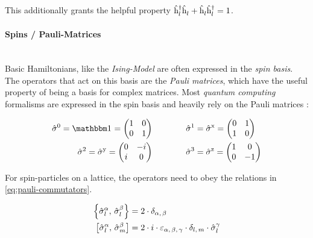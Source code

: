 This additionally grants the helpful property $\hat{\text{h}}^{\dagger }_{l}\hat{\text{h}}^{ }_{l} + \hat{\text{h}}^{ }_{l}\hat{\text{h}}^{\dagger }_{l}  = 1$.

\paragraph{Spins / Pauli-Matrices}\makebox{}\\

Basic Hamiltonians, like the \emph{Ising-Model} are often expressed in the \emph{spin basis}. 
The operators that act on this basis are the \emph{Pauli matrices}, which have the useful property of being a basis for complex matrices.
Most \emph{quantum computing} formalisms are expressed in the spin basis and heavily rely on the Pauli matrices \cite{quantumBookPaulisAndBasics}:

\begin{equation}
    \label{eq:pauli-matrices}
    \begin{split}
        \pauli{0} = \one = \left(\begin{matrix}
            1& 0 \\
            0& 1
        \end{matrix}\right) 
        \qquad & \qquad
        \pauli{1} = \pauli{x} = \left(\begin{matrix}
            0& 1 \\
            1& 0
        \end{matrix}\right) \\
        \pauli{2} = \pauli{y} = \left(\begin{matrix}
            0& -i \\
            i& 0
        \end{matrix}\right) 
        \qquad & \qquad
        \pauli{3} = \pauli{z} = \left(\begin{matrix}
            1& 0 \\
            0& -1
        \end{matrix}\right)
    \end{split}
\end{equation}

For spin-particles on a lattice, the operators need to obey the relations in \autoref{eq:pauli-commutators}.

\begin{equation}
    \label{eq:pauli-commutators}
    \begin{split}
        \left\{\pauli[l]{$\alpha$},\,\pauli[l]{$\beta$}\right\} &= 2 \cdot \delta_{\alpha,\,\beta}\\
        \left[\pauli[l]{$\alpha$},\,\pauli[m]{$\beta$}\right] &= 2 \cdot i \cdot \varepsilon_{\alpha,\,\beta,\,\gamma} \cdot \delta_{l,\,m}\cdot \pauli[l]{$\gamma$}
    \end{split}
\end{equation}

